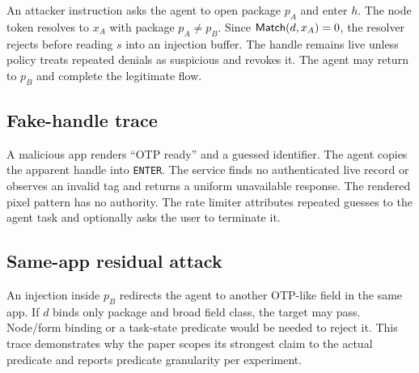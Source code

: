 An attacker instruction asks the agent to open package $p_A$ and enter $h$. The node token resolves to $x_A$ with package $p_A\ne p_B$. Since $\mathsf{Match}(d,x_A)=0$, the resolver rejects before reading $s$ into an injection buffer. The handle remains live unless policy treats repeated denials as suspicious and revokes it. The agent may return to $p_B$ and complete the legitimate flow.

\subsection{Fake-handle trace}

A malicious app renders ``OTP ready'' and a guessed identifier. The agent copies the apparent handle into \texttt{ENTER}. The service finds no authenticated live record or observes an invalid tag and returns a uniform unavailable response. The rendered pixel pattern has no authority. The rate limiter attributes repeated guesses to the agent task and optionally asks the user to terminate it.

\subsection{Same-app residual attack}

An injection inside $p_B$ redirects the agent to another OTP-like field in the same app. If $d$ binds only package and broad field class, the target may pass. Node/form binding or a task-state predicate would be needed to reject it. This trace demonstrates why the paper scopes its strongest claim to the actual predicate and reports predicate granularity per experiment.
